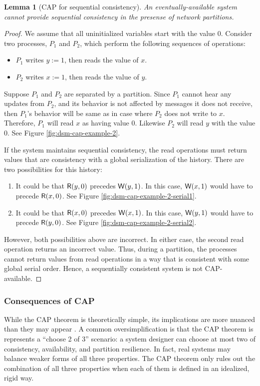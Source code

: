 \documentclass[]             %
{NASA}                       %
\newtheorem{lemma}[theorem]{Lemma}
\theoremstyle{definition}
\begin{document}
\begin{lemma}[CAP for sequential consistency]
  \label{thm:cap-sequential}
  An eventually-available system cannot provide sequential consistency
  in the presense of network partitions.
\end{lemma}
\begin{proof}
  We assume that all uninitialized variables start with the value
  $0$. Consider two processes, $P_1$ and $P_2$, which perform the
  following sequences of operations:
  \begin{itemize}
  \item $P_1$ writes $y := 1$, then reads the value of $x$.
  \item $P_2$ writes $x := 1$, then reads the value of $y$.
  \end{itemize}
  Suppose $P_1$ and $P_2$ are separated by a partition. Since $P_1$
  cannot hear any updates from $P_2$, and its behavior is not affected
  by messages it does not receive, then $P_1$'s behavior will be same
  as in case where $P_2$ does not write to $x$. Therefore, $P_1$ will
  read $x$ as having value 0. Likewise $P_2$ will read $y$ with the
  value $0$. See Figure \ref{fig:dsm-cap-example-2}.

  If the system maintains sequential consistency, the read operations
  must return values that are consistency with a global serialization
  of the history. There are two possibilities for this history:
  \begin{enumerate}
  \item It could be that $\mathsf{R}\!\left(y, 0\right)$ precedes
    $\mathsf{W}\!\left(y, 1\right)$. In this case, $\mathsf{W}\!\left(x, 1\right)$ would have to
    precede $\mathsf{R}\!\left(x, 0\right)$. See Figure
    \ref{fig:dsm-cap-example-2-serial1}.
  \item It could be that $\mathsf{R}\!\left(x, 0\right)$ precedes
    $\mathsf{W}\!\left(x, 1\right)$. In this case, $\mathsf{W}\!\left(y, 1\right)$ would have to
    precede $\mathsf{R}\!\left(y, 0\right)$. See Figure
    \ref{fig:dsm-cap-example-2-serial2}.
  \end{enumerate}
  However, both possibilities above are incorrect. In either case, the
  second read operation returns an incorrect value.  Thus, during a
  partition, the processes cannot return values from read operations
  in a way that is consistent with some global serial order. Hence, a
  sequentially consistent system is not CAP-available.
\end{proof}

\subsubsection{Consequences of CAP}
\label{interpretation-of-the-cap-theorem}
While the CAP theorem is theoretically simple, its implications are
more nuanced than they may appear \cite{2012CAP12Years}. A common
oversimplification is that the CAP theorem is represents a ``choose 2
of 3'' scenario: a system designer can choose at most two of
consistency, availability, and partition resilience. In fact, real
systems may balance weaker forms of all three properties. The CAP
theorem only rules out the combination of all three properties when
each of them is defined in an idealized, rigid way.
\end{document}
